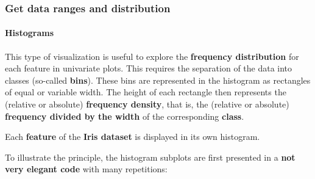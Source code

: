 \documentclass [oneside,10pt,a4paper,ngerman,BCOR10mm,headsepline,parindent,final]{scrartcl}
\begin{document}
    
    \hypertarget{get-data-ranges-and-distribution}{%
\subsubsection{Get data ranges and
distribution}\label{get-data-ranges-and-distribution}}

    \hypertarget{histograms}{%
\paragraph{Histograms}\label{histograms}}

This type of visualization is useful to explore the \textbf{frequency
distribution} for each feature in univariate plots. This requires the
separation of the data into classes (so-called \textbf{bins}). These
bins are represented in the histogram as rectangles of equal or variable
width. The height of each rectangle then represents the (relative or
absolute) \textbf{frequency density}, that is, the (relative or
absolute) \textbf{frequency divided by the width} of the corresponding
\textbf{class}.

Each \textbf{feature} of the \textbf{Iris dataset} is displayed in its
own histogram.

To illustrate the principle, the histogram subplots are first presented
in a \textbf{not very elegant code} with many repetitions:
\end{document}
